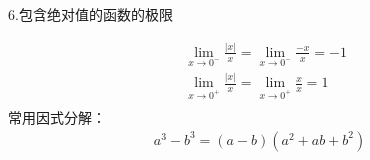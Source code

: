\documentclass[UTF8,fontset=ubuntu]{ctexart}
\begin{document}
\par
6.包含绝对值的函数的极限\par
\begin{align*}
	&\lim_{x\to0^-}\frac{|x|}{x}=\lim_{x\to0^-}\frac{-x}{x}=-1\\
	&\lim_{x\to0^+}\frac{|x|}{x}=\lim_{x\to0^+}\frac{x}{x}=1\\
\end{align*}
常用因式分解：
\begin{gather}
	a^3-b^3=(a-b)(a^2+ab+b^2)
\end{gather}
\end{document}
